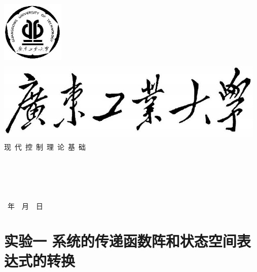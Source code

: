 \documentclass[UTF8]{ctexart}
\begin{document}
	\begin{titlepage}
               	\includegraphics[width=3.0cm,height=3.0cm]{gdut1.jpg}\\

		\centering
		\quad\includegraphics[width=13cm,height=4cm]{gdut.jpg}\\
		\vspace*{0.5cm}
		{\fontsize{30pt}\baselineskip 现\quad\ 代\quad\ 控\quad\ 制\quad\ 理\quad\ 论\quad\ 基\quad\ 础}\\

		 \vskip 2.0cm
		 \fontsize{19pt}\baselineskip
		 \underline{}\\%
		 \vskip 0.9cm
		 \underline{}\\
		 \vskip 0.9cm
		 \underline{}\\
		 \vskip 0.9cm
		 \underline{}\\
		 \vskip 0.9cm
		 \underline{}\\
		 \vskip 2cm
		 \LARGE \textbf{\number \year }~年~\textbf{\number\month}~月~\textbf{\number\day}~日		 
	\end{titlepage}



\tableofcontents\thispagestyle{empty}
\newpage
\setcounter{page}{1}
\section{实验一 \quad 系统的传递函数阵和状态空间表达式的转换 }
\end{document}
